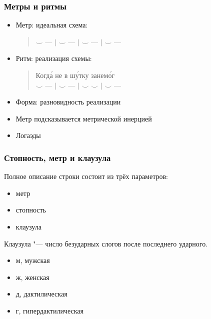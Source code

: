\documentclass{beamer}
\begin{document}



\begin{frame}
\frametitle{Метры и ритмы}

\begin{itemize}
\item Метр: идеальная схема: \\
\begin{verse}
$\smile$ --- $\mid$ $\smile$ --- $\mid$ $\smile$ --- $\mid$ $\smile$ ---
\end{verse}
\item Ритм: реализация схемы:\\
\begin{verse}
 Когд\'{а} не в ш\'{у}тку занем\'{о}г\\
 $\smile$ --- $\mid$ $\smile$ --- $\mid$ $\smile$ $\smile$ $\mid$ $\smile$ ---
\end{verse}
\item Форма: разновидность реализации
\item Метр подсказывается метрической инерцией
\item Логаэды
\end{itemize}


\end{frame}


\begin{frame}
\frametitle{Стопность, метр и клаузула}

Полное описание строки состоит из трёх параметров:

\begin{itemize}
\item метр
\item стопность
\item клаузула
\end{itemize}

Клаузула "--- число безударных слогов после последнего ударного.

\begin{itemize}
\item м, мужская
\item ж, женская
\item д, дактилическая
\item г, гипердактилическая
\end{itemize}

\end{frame}
\end{document}
